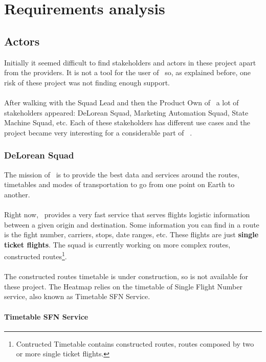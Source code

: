 
\chapter{Requirements analysis}

\label{chapter04}

\section{Actors}

Initially it seemed difficult to find stakeholders and actors in these project apart from the providers. It is not a tool for the user of \company\, so, as explained before, one risk of these project was not finding enough support.
\\\\
After walking with the Squad Lead and then the Product Own of \squad\ a lot of stakeholders appeared: DeLorean Squad, Marketing Automation Squad, State Machine Squad, etc. Each of these stakeholders has different use cases and the project became very interesting for a considerable part of \company\ .

\subsection{DeLorean Squad}

The mission of \squad\ is to provide the best data and services around the routes, timetables and modes of transportation to go from one point on Earth to another.
\\\\
Right now, \squad\ provides a very fast service that serves flights logistic information between a given origin and destination. Some information you can find in a route is the fight number, carriers, stops, date ranges, etc. These flights are just \textbf{single ticket flights}. The squad is currently working on more complex routes, constructed routes\footnote{Contructed Timetable contains constructed routes, routes composed by two or more single ticket flights.}.
\\\\
The constructed routes timetable is under construction, so is not available for these project. The Heatmap relies on the timetable of Single Flight Number service, also known as Timetable SFN Service.

\subsubsection{Timetable SFN Service}

